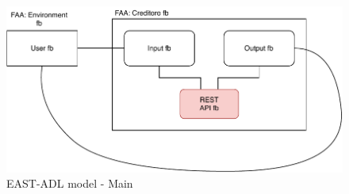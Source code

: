 \begin{figure}[h]
\centering
\includegraphics[scale=1]{figures/EAST-ADL/main.pdf}
\caption{EAST-ADL model - Main}
\label{fig:main}
\end{figure}